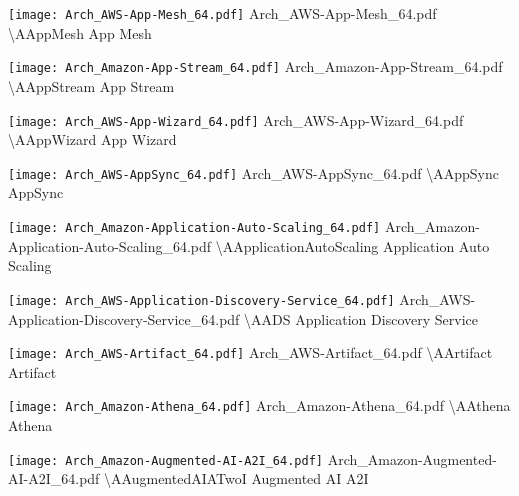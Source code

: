  {\texttt{[image: Arch\_AWS-App-Mesh\_64.pdf]}} {Arch\_AWS-App-Mesh\_64.pdf} {{\textbackslash}AAppMesh} {App Mesh}

 {\texttt{[image: Arch\_Amazon-App-Stream\_64.pdf]}} {Arch\_Amazon-App-Stream\_64.pdf} {{\textbackslash}AAppStream} {App Stream}

 {\texttt{[image: Arch\_AWS-App-Wizard\_64.pdf]}} {Arch\_AWS-App-Wizard\_64.pdf} {{\textbackslash}AAppWizard} {App Wizard}

 {\texttt{[image: Arch\_AWS-AppSync\_64.pdf]}} {Arch\_AWS-AppSync\_64.pdf} {{\textbackslash}AAppSync} {AppSync}

 {\texttt{[image: Arch\_Amazon-Application-Auto-Scaling\_64.pdf]}} {Arch\_Amazon-Application-Auto-Scaling\_64.pdf} {{\textbackslash}AApplicationAutoScaling} {Application Auto Scaling}

 {\texttt{[image: Arch\_AWS-Application-Discovery-Service\_64.pdf]}} {Arch\_AWS-Application-Discovery-Service\_64.pdf} {{\textbackslash}AADS} {Application Discovery Service}

 {\texttt{[image: Arch\_AWS-Artifact\_64.pdf]}} {Arch\_AWS-Artifact\_64.pdf} {{\textbackslash}AArtifact} {Artifact}

 {\texttt{[image: Arch\_Amazon-Athena\_64.pdf]}} {Arch\_Amazon-Athena\_64.pdf} {{\textbackslash}AAthena} {Athena}

 {\texttt{[image: Arch\_Amazon-Augmented-AI-A2I\_64.pdf]}} {Arch\_Amazon-Augmented-AI-A2I\_64.pdf} {{\textbackslash}AAugmentedAIATwoI} {Augmented AI A2I}

